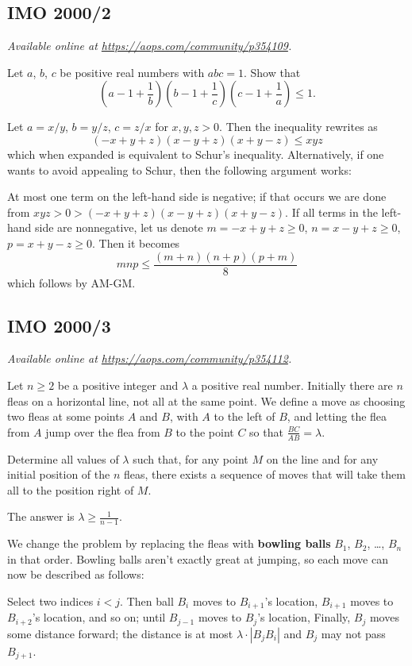 \documentclass[11pt]{scrartcl}
\begin{document}
\subsection{IMO 2000/2}
\textsl{Available online at \url{https://aops.com/community/p354109}.}
\begin{mdframed}[style=mdpurplebox,frametitle={Problem statement}]
Let $a$, $b$, $c$ be positive real numbers with $abc = 1$.
Show that
\[
  \left( a - 1 + \frac 1b \right)
  \left( b - 1 + \frac 1c \right)
  \left( c - 1 + \frac 1a \right)
  \le 1.
\]
\end{mdframed}
Let $a = x/y$, $b = y/z$, $c = z/x$ for $x,y,z > 0$.
Then the inequality rewrites as
\[ (-x+y+z)(x-y+z)(x+y-z) \le xyz \]
which when expanded is equivalent to Schur's inequality.
Alternatively, if one wants to avoid appealing to Schur,
then the following argument works:
\begin{itemize}
  \ii At most one term on the left-hand side is negative;
  if that occurs we are done from $xyz > 0 > (-x+y+z)(x-y+z)(x+y-z)$.
  \ii If all terms in the left-hand side are nonnegative,
  let us denote $m = -x+y+z \ge 0$, $n = x-y+z \ge 0$, $p = x+y-z \ge 0$.
  Then it becomes
  \[ mnp \le \frac{(m+n)(n+p)(p+m)}{8} \]
  which follows by AM-GM.
\end{itemize}
\pagebreak

\subsection{IMO 2000/3}
\textsl{Available online at \url{https://aops.com/community/p354112}.}
\begin{mdframed}[style=mdpurplebox,frametitle={Problem statement}]
Let $n \ge 2$ be a positive integer
and $\lambda$ a positive real number.
Initially there are $n$ fleas on a horizontal line,
not all at the same point.
We define a move as choosing two fleas at some points $A$ and $B$,
with $A$ to the left of $B$,
and letting the flea from $A$ jump over the flea from $B$ to the point $C$
so that $\frac{BC}{AB} = \lambda$.

Determine all values of $ \lambda$ such that,
for any point $M$ on the line
and for any initial position of the $n$ fleas,
there exists a sequence of moves that will take
them all to the position right of $M$.
\end{mdframed}
The answer is $\lambda \ge \frac{1}{n-1}$.

We change the problem by replacing the fleas
with \textbf{bowling balls} $B_1$, $B_2$, \dots, $B_n$ in that order.
Bowling balls aren't exactly great at jumping,
so each move can now be described as follows:
\begin{itemize}
\ii Select two indices $i < j$.
Then ball $B_i$ moves to $B_{i+1}$'s location,
$B_{i+1}$ moves to $B_{i+2}$'s location, and so on;
until $B_{j-1}$ moves to $B_j$'s location,
\ii Finally, $B_j$ moves some distance forward;
the distance is at most $\lambda \cdot |B_j B_i|$
and $B_j$ may not pass $B_{j+1}$.
\end{itemize}
\end{document}

